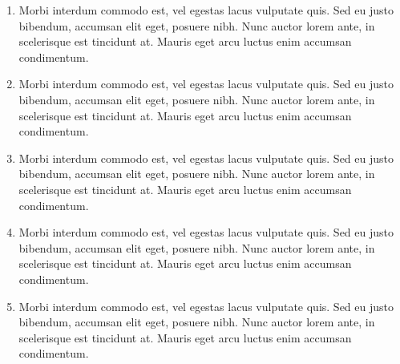 \begin{enumerate}
    \item Morbi interdum commodo est, vel egestas lacus vulputate quis. Sed eu justo bibendum, accumsan elit eget, posuere nibh. Nunc auctor lorem ante, in scelerisque est tincidunt at. Mauris eget arcu luctus enim accumsan condimentum. 
    \item Morbi interdum commodo est, vel egestas lacus vulputate quis. Sed eu justo bibendum, accumsan elit eget, posuere nibh. Nunc auctor lorem ante, in scelerisque est tincidunt at. Mauris eget arcu luctus enim accumsan condimentum. 
    \item Morbi interdum commodo est, vel egestas lacus vulputate quis. Sed eu justo bibendum, accumsan elit eget, posuere nibh. Nunc auctor lorem ante, in scelerisque est tincidunt at. Mauris eget arcu luctus enim accumsan condimentum. 
    \item Morbi interdum commodo est, vel egestas lacus vulputate quis. Sed eu justo bibendum, accumsan elit eget, posuere nibh. Nunc auctor lorem ante, in scelerisque est tincidunt at. Mauris eget arcu luctus enim accumsan condimentum. 
    \item Morbi interdum commodo est, vel egestas lacus vulputate quis. Sed eu justo bibendum, accumsan elit eget, posuere nibh. Nunc auctor lorem ante, in scelerisque est tincidunt at. Mauris eget arcu luctus enim accumsan condimentum. 
\end{enumerate}